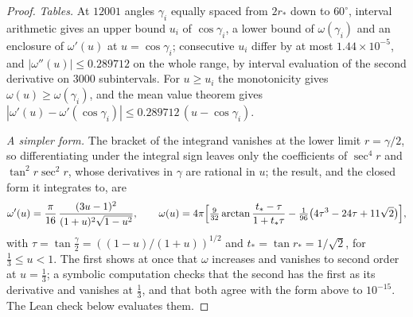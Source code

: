 \documentclass[11pt,reqno]{amsart}
\renewcommand{\_}{\origunderscore\allowbreak}
\numberwithin{equation}{section}
\theoremstyle{plain}
\theoremstyle{definition}
\theoremstyle{remark}
\begin{document}
\begin{proof}
\emph{Tables.} At $12001$ angles $\gamma_i$ equally spaced from $2r_*$ down
to $60^\circ$, interval arithmetic gives an upper bound $u_i$ of
$\cos\gamma_i$, a lower bound of $\omega(\gamma_i)$ and an enclosure of
$\omega'(u)$ at $u=\cos\gamma_i$; consecutive $u_i$ differ by at most
$1.44\times10^{-5}$, and $|\omega''(u)|\le0.289712$ on the whole range,
by interval evaluation of the second derivative on $3000$ subintervals.
For $u\ge u_i$ the monotonicity gives $\omega(u)\ge\omega(\gamma_i)$, and
the mean value theorem gives $|\omega'(u)-\omega'(\cos\gamma_i)|\le0.289712\,(u-\cos\gamma_i)$.

\emph{A simpler form.} The bracket of the integrand vanishes at the lower
limit $r=\gamma/2$, so differentiating under the integral sign leaves only
the coefficients of $\sec^4r$ and $\tan^2r\sec^2r$, whose derivatives in
$\gamma$ are rational in $u$; the result, and the closed form it integrates to, are
\[
  \omega'(u)=\frac{\pi}{16}\,\frac{(3u-1)^2}{(1+u)^2\sqrt{1-u^2}},\qquad
  \omega(u)=4\pi\Bigl[\tfrac{9}{32}\arctan\frac{t_*-\tau}{1+t_*\tau}
  -\tfrac{1}{96}\bigl(4\tau^3-24\tau+11\sqrt2\bigr)\Bigr],
\]
with $\tau=\tan\frac\gamma2=((1-u)/(1+u))^{1/2}$ and $t_*=\tan r_*=1/\sqrt2$,
for $\tfrac13\le u<1$. The first shows at once that $\omega$ increases and
vanishes to second order at $u=\tfrac13$; a symbolic computation
checks that the second has the first as its derivative and
vanishes at $\tfrac13$, and that both agree with the form above to
$10^{-15}$. The Lean check below evaluates them.


\end{proof}
\end{document}
